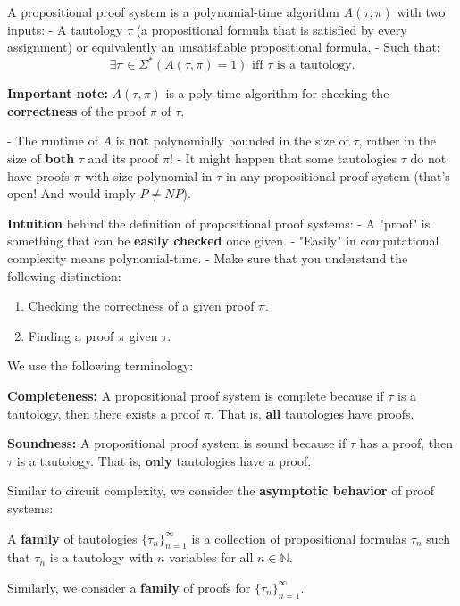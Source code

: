 \begin{definition}
A propositional proof system is a polynomial-time algorithm $A(\tau, \pi)$ with two inputs:  
- A tautology $\tau$ (a propositional formula that is satisfied by every assignment) or equivalently an unsatisfiable propositional formula,  
- Such that:  
\[
\exists \pi \in \Sigma^* (A(\tau, \pi) = 1) \text{ iff } \tau \text{ is a tautology}.
\]
\end{definition}

\textbf{Important note:} $A(\tau, \pi)$ is a poly-time algorithm for checking the \textbf{correctness} of the proof $\pi$ of $\tau$.

- The runtime of $A$ is \textbf{not} polynomially bounded in the size of $\tau$, rather in the size of \textbf{both} $\tau$ and its proof $\pi$!
- It might happen that some tautologies $\tau$ do not have proofs $\pi$ with size polynomial in $\tau$ in any propositional proof system (that’s open! And would imply $P \neq NP$).

\textbf{Intuition} behind the definition of propositional proof systems:
- A "proof" is something that can be \textbf{easily checked} once given.
- "Easily" in computational complexity means polynomial-time.
- Make sure that you understand the following distinction:
  \begin{enumerate}
      \item Checking the correctness of a given proof $\pi$.
      \item Finding a proof $\pi$ given $\tau$.
  \end{enumerate}


We use the following terminology:

\textbf{Completeness:} A propositional proof system is complete because if $\tau$ is a tautology, then there exists a proof $\pi$.  
That is, \textbf{all} tautologies have proofs.

\textbf{Soundness:} A propositional proof system is sound because if $\tau$ has a proof, then $\tau$ is a tautology.  
That is, \textbf{only} tautologies have a proof.

Similar to circuit complexity, we consider the \textbf{asymptotic behavior} of proof systems:

A \textbf{family} of tautologies $\{\tau_n\}_{n=1}^{\infty}$ is a collection of propositional formulas $\tau_n$ such that $\tau_n$ is a tautology with $n$ variables for all $n \in \mathbb{N}$.

Similarly, we consider a \textbf{family} of proofs for $\{\tau_n\}_{n=1}^{\infty}$.

